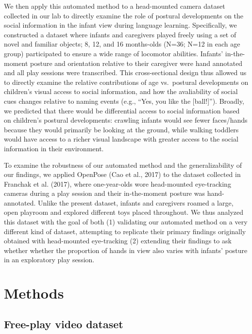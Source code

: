 \documentclass[english,man]{apa6}
\begin{document}
We then apply this automated method to a head-mounted camera dataset
collected in our lab to directly examine the role of postural
developments on the social information in the infant view during
language learning. Specifically, we constructed a dataset where infants
and caregivers played freely using a set of novel and familiar objects;
8, 12, and 16 months-olds (N=36; N=12 in each age group) participated to
ensure a wide range of locomotor abilities. Infants' in-the-moment
posture and orientation relative to their caregiver were hand annotated
and all play sessions were transcribed. This cross-sectional design thus
allowed us to directly examine the relative contributions of age
vs.~postural developments on children's visual access to social
information, and how the avaliability of social cues changes relative to
naming events (e.g., \enquote{Yes, you like the {[}ball!{]}}). Broadly,
we predicted that there would be differential access to social
information based on children's postural developments: crawling infants
would see fewer faces/hands because they would primarily be looking at
the ground, while walking toddlers would have access to a richer visual
landscape with greater access to the social information in their
environment.

To examine the robustness of our automated method and the
generalizability of our findings, we applied OpenPose (Cao et al., 2017)
to the dataset collected in Franchak et al. (2017), where one-year-olds
wore head-mounted eye-tracking cameras during a play session and their
in-the-moment posture was hand-annotated. Unlike the present dataset,
infants and caregivers roamed a large, open playroom and explored
different toys placed throughout. We thus analyzed this dataset with the
goal of both (1) validating our automated method on a very different
kind of dataset, attempting to replicate their primary findings
originally obtained with head-mounted eye-tracking (2) extending their
findings to ask whether whether the proportion of hands in view also
varies with infants' posture in an exploratory play session.

\section{Methods}\label{methods}

\subsection{Free-play video dataset}\label{free-play-video-dataset}
\end{document}
